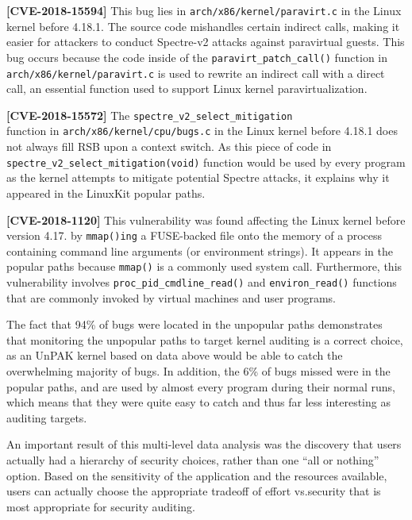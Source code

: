 \noindent
\textbf{[CVE-2018-15594]} 
\newline
This bug lies in \texttt{arch/x86/kernel/paravirt.c} in the Linux kernel before 4.18.1. The source code mishandles certain indirect calls, 
making it easier for attackers to conduct Spectre-v2 attacks against paravirtual guests. 
This bug occurs because the code inside of the \texttt{paravirt\_patch\_call()} function in \texttt{arch/x86/kernel/paravirt.c} is used to rewrite an indirect call with a direct call, 
an essential function used to support Linux kernel paravirtualization. 

\noindent
\textbf{[CVE-2018-15572]} 
\newline
The \texttt{spectre\_v2\_select\_mitigation}  \\ 
function in \texttt{arch/x86/kernel/cpu/bugs.c} in the Linux kernel before 4.18.1 does not always fill RSB upon a context switch. 
As this piece of code in \\
\texttt{spectre\_v2\_select\_mitigation(void)} function would be used by every program as the kernel attempts to mitigate potential Spectre attacks, 
it explains why it appeared in the LinuxKit popular paths. 

\noindent
\textbf{[CVE-2018-1120]} 
\newline
This vulnerability was found affecting the Linux kernel before version 4.17. by 
\texttt{mmap()ing} a FUSE-backed file onto the memory of a process containing command line arguments (or environment strings). 
It appears in the popular paths because \texttt{mmap()} is a commonly used system call. 
Furthermore, this vulnerability involves \texttt{proc\_pid\_cmdline\_read()} and \texttt{environ\_read()} functions that are commonly invoked by virtual machines and user programs. 

The fact that 94\% of bugs were located in the unpopular paths demonstrates that monitoring the unpopular paths to target kernel auditing is a correct choice, 
as an UnPAK kernel based on data above would be able to catch the overwhelming majority of bugs. In addition, the 6\% of bugs missed were in the popular paths, 
and are used by almost every program during their normal runs, which means that they were quite easy to catch and thus far less interesting as auditing targets. 

An important result of this multi-level data analysis was the discovery  that users actually had a hierarchy of security choices, rather than one ``all or nothing'' option. 
Based on the sensitivity of the application and the resources available, users can actually choose the appropriate tradeoff of effort vs.security that is most appropriate for  security auditing. 

